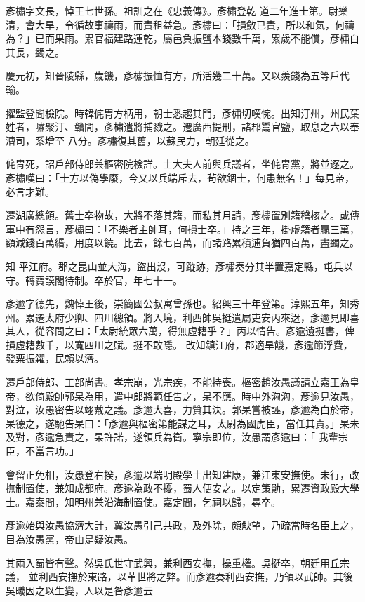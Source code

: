 \begin{pinyinscope}
 彥橚字文長，悼王七世孫。祖訓之在《忠義傳》。彥橚登乾
 道二年進士第。尉樂清，會大旱，令循故事禱雨，而責租益急。彥橚曰：「損斂已責，所以和氣，何禱為？」已而果雨。累官福建路運乾，屬邑負振鹽本錢數千萬，累歲不能償，彥橚白其長，蠲之。



 慶元初，知晉陵縣，歲饑，彥橚振恤有方，所活幾二十萬。又以羨錢為五等戶代輸。



 擢監登聞檢院。時韓侂冑方柄用，朝士悉趨其門，彥橚切嘆惋。出知汀州，州民葉姓者，嘯聚汀、贛間，彥橚遣將捕戮之。遷廣西提刑，諸郡鬻官鹽，取息之六以奉漕司，系增至
 八分。彥橚復其舊，以蘇民力，朝廷從之。



 侂冑死，詔戶部侍郎兼樞密院檢詳。士大夫人前與兵議者，坐侂冑黨，將並逐之。彥橚嘆曰：「士方以偽學廢，今又以兵端斥去，茍欲錮士，何患無名！」每見帝，必言才難。



 遷湖廣總領。舊士卒物故，大將不落其籍，而私其月請，彥橚置別籍稽核之。或傳軍中有怨言，彥橚曰：「不樂者主帥耳，何損士卒。」持之三年，掛虛籍者贏三萬，額減錢百萬緡，用度以饒。比去，餘七百萬，而諸路累積逋負猶四百萬，盡蠲之。



 知
 平江府。郡之昆山並大海，盜出沒，可蹤跡，彥橚奏分其半置嘉定縣，屯兵以守。轉寶謨閣待制。卒於官，年七十一。



 彥逾字德先，魏悼王後，崇簡國公叔寓曾孫也。紹興三十年登第。淳熙五年，知秀州。累遷太府少卿、四川總領。將入境，利西帥吳挺遣屬吏安丙來迓，彥逾見即喜其人，從容問之曰：「太尉統眾六萬，得無虛籍乎？」丙以情告。彥逾遺挺書，俾損虛籍數千，以寬四川之賦。挺不敢隱。
 改知鎮江府，郡適旱饑，彥逾節浮費，發粟振糴，民賴以濟。



 遷戶部侍郎、工部尚書。孝宗崩，光宗疾，不能持喪。樞密趙汝愚議請立嘉王為皇帝，欲倚殿帥郭杲為用，遣中郎將範任告之，杲不應。時中外洶洶，彥逾見汝愚，對泣，汝愚密告以翊戴之議。彥逾大喜，力贊其決。郭杲嘗被誣，彥逾為白於帝，杲德之，遂馳告杲曰：「彥逾與樞密第能謀之耳，太尉為國虎臣，當任其責。」杲未及對，彥逾急責之，杲許諾，遂領兵為衛。寧宗即位，汝愚謂彥逾曰：「
 我輩宗臣，不當言功。」



 會留正免相，汝愚登右揆，彥逾以端明殿學士出知建康，兼江東安撫使。未行，改撫制置使，兼知成都府。彥逾為政不擾，蜀人便安之。以定策勛，累遷資政殿大學士。嘉泰間，知明州兼沿海制置使。嘉定間，乞祠以歸，尋卒。



 彥逾始與汝愚協濟大計，冀汝愚引己共政，及外除，頗觖望，乃疏當時名臣上之，目為汝愚黨，帝由是疑汝愚。



 其兩入蜀皆有聲。然吳氏世守武興，兼利西安撫，操重權。吳挺卒，朝廷用丘宗議，
 並利西安撫於東路，以革世將之弊。而彥逾奏利西安撫，乃領以武帥。其後吳曦因之以生變，人以是咎彥逾云



\end{pinyinscope}